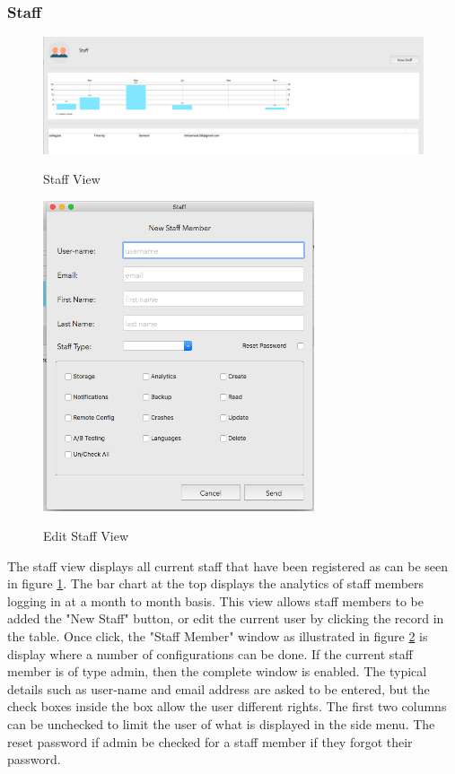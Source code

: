 \subsubsection{Staff}

\begin{figure}[!h]
    \caption{Staff View}
    \centering
    \includegraphics[width=120mm]{images/dashboard/staff}
    \label{fig:staff}
\end{figure} 

\begin{figure}[!h]
    \caption{Edit Staff View}
    \centering
    \includegraphics[width=80mm]{images/dashboard/edit_staff}
    \label{fig:edit_staff}
\end{figure} 

The staff view displays all current staff that have been registered as can be seen in figure \ref{fig:staff}. The bar chart at the top displays the analytics of staff members logging in at a month to month basis. This view allows staff members to be added the "New Staff" button, or edit the current user by clicking the record in the table. Once click, the "Staff Member" window as illustrated in figure \ref{fig:edit_staff} is display where a number of configurations can be done. If the current staff member is of type admin, then the complete window is enabled. The typical details such as user-name and email address are asked to be entered, but the check boxes inside the box allow the user different rights. The first two columns can be unchecked to limit the user of what is displayed in the side menu. The reset password if admin be checked for a staff member if they forgot their password. 

